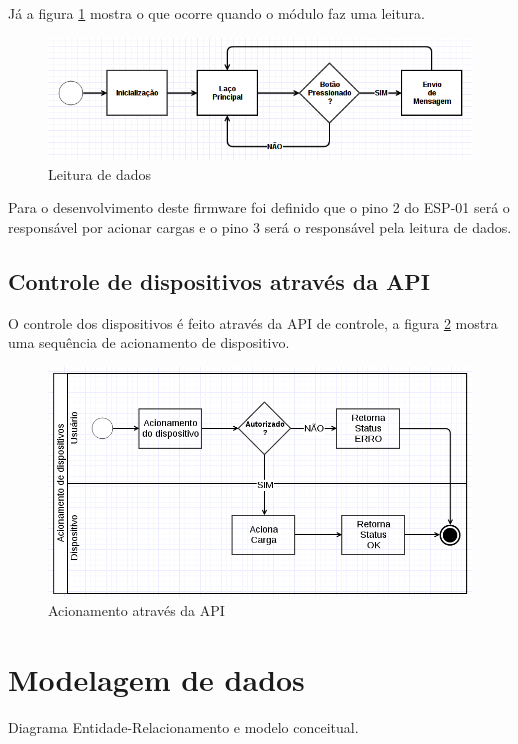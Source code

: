 Já a figura \ref{fw-leitura} mostra o que ocorre quando o módulo faz uma leitura.

\begin{figure}[H]
\caption{\label{fw-leitura} Leitura de dados}
\includegraphics[scale=0.5]{img/fw-leitura.png}
\end{figure}

Para o desenvolvimento deste firmware foi definido que o pino 2 do ESP-01 será o responsável por acionar cargas e o pino 3 será o responsável pela leitura de dados.

\subsection{Controle de dispositivos através da API}
O controle dos dispositivos é feito através da API de controle, a figura \ref{api-acionamento} mostra uma sequência de acionamento de dispositivo.

\begin{figure}[H]
\caption{\label{api-acionamento} Acionamento através da API}
\includegraphics[scale=0.5]{img/acionamento-api.png}
\end{figure}

\section{Modelagem de dados}
Diagrama Entidade-Relacionamento e modelo conceitual.

